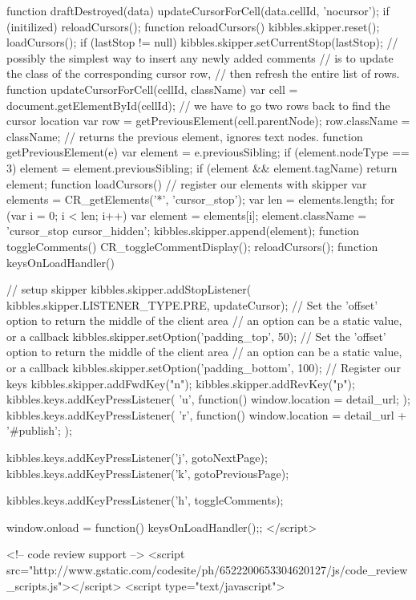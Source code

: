  function draftDestroyed(data) {
 updateCursorForCell(data.cellId, 'nocursor');
 if (initilized) {
 reloadCursors();
 }
 }
 function reloadCursors() {
 kibbles.skipper.reset();
 loadCursors();
 if (lastStop != null) {
 kibbles.skipper.setCurrentStop(lastStop);
 }
 }
 // possibly the simplest way to insert any newly added comments
 // is to update the class of the corresponding cursor row,
 // then refresh the entire list of rows.
 function updateCursorForCell(cellId, className) {
 var cell = document.getElementById(cellId);
 // we have to go two rows back to find the cursor location
 var row = getPreviousElement(cell.parentNode);
 row.className = className;
 }
 // returns the previous element, ignores text nodes.
 function getPreviousElement(e) {
 var element = e.previousSibling;
 if (element.nodeType == 3) {
 element = element.previousSibling;
 }
 if (element && element.tagName) {
 return element;
 }
 }
 function loadCursors() {
 // register our elements with skipper
 var elements = CR_getElements('*', 'cursor_stop');
 var len = elements.length;
 for (var i = 0; i < len; i++) {
 var element = elements[i]; 
 element.className = 'cursor_stop cursor_hidden';
 kibbles.skipper.append(element);
 }
 }
 function toggleComments() {
 CR_toggleCommentDisplay();
 reloadCursors();
 }
 function keysOnLoadHandler() {
 // setup skipper
 kibbles.skipper.addStopListener(
 kibbles.skipper.LISTENER_TYPE.PRE, updateCursor);
 // Set the 'offset' option to return the middle of the client area
 // an option can be a static value, or a callback
 kibbles.skipper.setOption('padding_top', 50);
 // Set the 'offset' option to return the middle of the client area
 // an option can be a static value, or a callback
 kibbles.skipper.setOption('padding_bottom', 100);
 // Register our keys
 kibbles.skipper.addFwdKey("n");
 kibbles.skipper.addRevKey("p");
 kibbles.keys.addKeyPressListener(
 'u', function() { window.location = detail_url; });
 kibbles.keys.addKeyPressListener(
 'r', function() { window.location = detail_url + '#publish'; });
 
 kibbles.keys.addKeyPressListener('j', gotoNextPage);
 kibbles.keys.addKeyPressListener('k', gotoPreviousPage);
 
 
 kibbles.keys.addKeyPressListener('h', toggleComments);
 
 }
 window.onload = function() {keysOnLoadHandler();};
 </script>

<!-- code review support -->
<script src="http://www.gstatic.com/codesite/ph/6522200653304620127/js/code_review_scripts.js"></script>
<script type="text/javascript">
 
